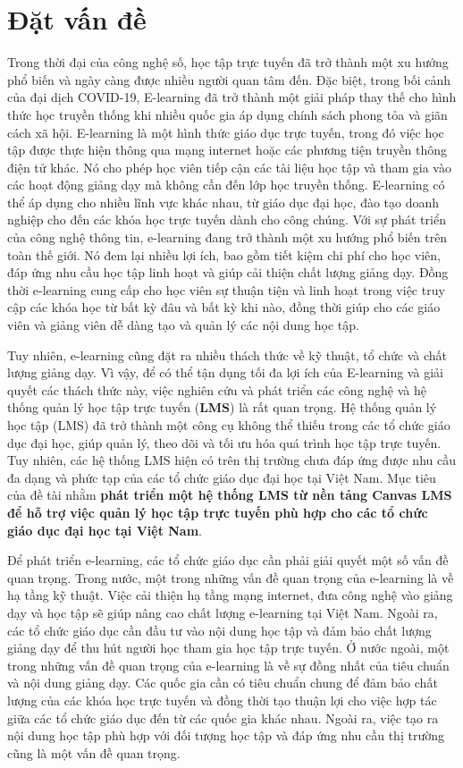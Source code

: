\documentclass[../Thesis.tex]{subfiles}
\begin{document}
\section{Đặt vấn đề}
Trong thời đại của công nghệ số, học tập trực tuyến đã trở thành một xu hướng phổ biến và ngày càng được nhiều người quan tâm đến. Đặc biệt, trong bối cảnh của đại dịch COVID-19,
E-learning đã trở thành một giải pháp thay thế cho hình thức học truyền thống khi nhiều quốc gia áp dụng chính sách phong tỏa và giãn cách xã hội.
E-learning là một hình thức giáo dục trực tuyến, trong đó việc học tập được thực hiện thông qua mạng internet hoặc các phương tiện truyền thông điện tử khác. Nó cho phép học viên tiếp cận các tài liệu học tập và tham gia vào các hoạt động giảng dạy mà không cần đến lớp học truyền thống. E-learning có thể áp dụng cho nhiều lĩnh vực khác nhau, từ giáo dục đại học, đào tạo doanh nghiệp cho đến các khóa học trực tuyến dành cho công chúng.
Với sự phát triển của công nghệ thông tin, e-learning đang trở thành một xu hướng phổ biến trên toàn thế giới. Nó đem lại nhiều lợi ích, bao gồm tiết kiệm chi phí cho học viên, đáp ứng nhu cầu học tập linh hoạt và giúp cải thiện chất lượng giảng dạy.
Đồng thời e-learning cung cấp cho học viên sự thuận tiện và linh hoạt trong việc truy cập các khóa học từ bất kỳ đâu và bất kỳ khi nào, đồng thời giúp cho các giáo viên và giảng viên dễ dàng tạo và quản lý các nội dung học tập.

Tuy nhiên, e-learning cũng đặt ra nhiều thách thức về kỹ thuật, tổ chức và chất lượng giảng dạy. Vì vậy, để có thể tận dụng tối đa lợi ích của E-learning và giải quyết các thách thức này,
việc nghiên cứu và phát triển các công nghệ và hệ thống quản lý học tập trực tuyến (\textbf{LMS}) là rất quan trọng.
Hệ thống quản lý học tập (LMS) đã trở thành một công cụ không thể thiếu trong các tổ chức giáo dục đại học, giúp quản lý, theo dõi và tối ưu hóa quá trình học tập trực tuyến. Tuy nhiên, các hệ thống LMS hiện có trên thị trường chưa đáp ứng được nhu cầu đa dạng và phức tạp của các tổ chức giáo dục đại học tại Việt Nam.
Mục tiêu của đề tài nhằm \textbf{phát triển một hệ thống LMS từ nền tảng Canvas LMS để hỗ trợ việc quản lý học tập trực tuyến phù hợp cho các tổ chức giáo dục đại học tại Việt Nam}.

Để phát triển e-learning, các tổ chức giáo dục cần phải giải quyết một số vấn đề quan trọng.
Trong nước, một trong những vấn đề quan trọng của e-learning là về hạ tầng kỹ thuật. Việc cải thiện hạ tầng mạng internet, đưa công nghệ vào giảng dạy và học tập sẽ giúp nâng cao chất lượng e-learning tại Việt Nam. Ngoài ra, các tổ chức giáo dục cần đầu tư vào nội dung học tập và đảm bảo chất lượng giảng dạy để thu hút người học tham gia học tập trực tuyến.
Ở nước ngoài, một trong những vấn đề quan trọng của e-learning là về sự đồng nhất của tiêu chuẩn và nội dung giảng dạy. Các quốc gia cần có tiêu chuẩn chung để đảm bảo chất lượng của các khóa học trực tuyến và đồng thời tạo thuận lợi cho việc hợp tác giữa các tổ chức giáo dục đến từ các quốc gia khác nhau. Ngoài ra, việc tạo ra nội dung học tập phù hợp với đối tượng học tập và đáp ứng nhu cầu thị trường cũng là một vấn đề quan trọng.
\end{document}
